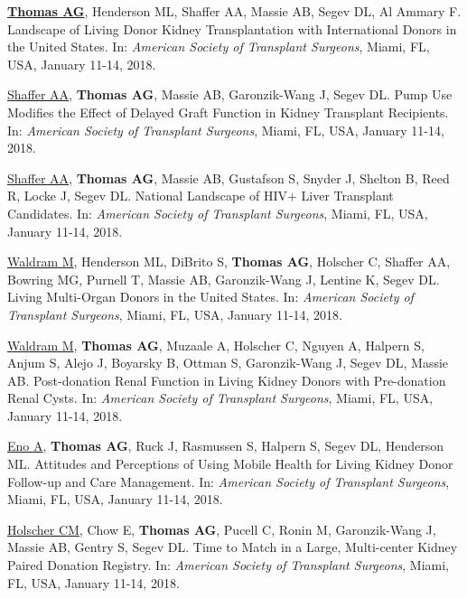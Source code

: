 \documentclass[10pt]{article}
\begin{document}
\begin{bibenum}
\item \underline{\textbf{Thomas AG}}, Henderson ML, Shaffer AA,
  Massie AB, Segev DL, Al Ammary F. Landscape of Living Donor Kidney
  Transplantation with International Donors in the United States.
  In: \emph{American Society of Transplant Surgeons},
  Miami, FL, USA, January 11-14, 2018.

\item \underline{Shaffer AA}, \textbf{Thomas AG}, Massie AB,
  Garonzik-Wang J, Segev DL. Pump Use Modifies the Effect of Delayed
  Graft Function in Kidney Transplant Recipients.
  In: \emph{American Society of Transplant Surgeons},
  Miami, FL, USA, January 11-14, 2018.

\item \underline{Shaffer AA}, \textbf{Thomas AG}, Massie AB,
  Gustafson S, Snyder J, Shelton B, Reed R, Locke J, Segev DL.
  National Landscape of HIV+ Liver Transplant
  Candidates. In: \emph{American Society of Transplant Surgeons},
  Miami, FL, USA, January 11-14, 2018.

\item \underline{Waldram M}, Henderson ML, DiBrito S, \textbf{Thomas AG},
  Holscher C, Shaffer AA, Bowring MG, Purnell T, Massie AB,
  Garonzik-Wang J, Lentine K, Segev DL. Living Multi-Organ Donors in the
  United States.
  In: \emph{American Society of Transplant Surgeons},
  Miami, FL, USA, January 11-14, 2018.

\item \underline{Waldram M}, \textbf{Thomas AG}, Muzaale A,
  Holscher C, Nguyen A, Halpern S, Anjum S, Alejo J, Boyarsky B, Ottman S,
  Garonzik-Wang J, Segev DL, Massie AB. Post-donation Renal Function in Living
  Kidney Donors with Pre-donation Renal Cysts.
  In: \emph{American Society of Transplant Surgeons},
  Miami, FL, USA, January 11-14, 2018.

\item \underline{Eno A}, \textbf{Thomas AG}, Ruck J, Rasmussen S, Halpern S,
  Segev DL, Henderson ML. Attitudes and Perceptions of Using Mobile Health
  for Living Kidney Donor Follow-up and Care Management.
  In: \emph{American Society of Transplant Surgeons},
  Miami, FL, USA, January 11-14, 2018.

\item \underline{Holscher CM}, Chow E, \textbf{Thomas AG}, Pucell C, Ronin M,
  Garonzik-Wang J, Massie AB, Gentry S, Segev DL. Time to Match in a Large,
  Multi-center Kidney Paired Donation Registry.
  In: \emph{American Society of Transplant Surgeons},
  Miami, FL, USA, January 11-14, 2018.


\end{bibenum}
\end{document}
